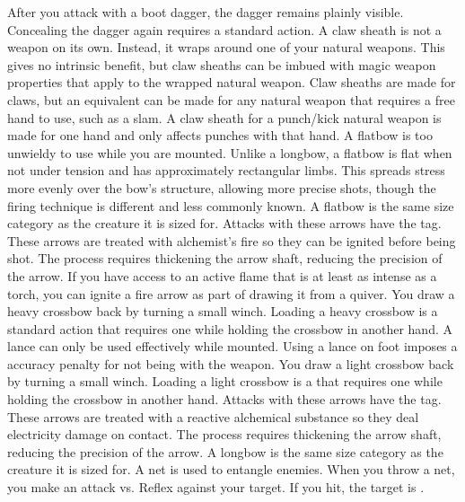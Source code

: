     After you attack with a boot dagger, the dagger remains plainly visible.
    Concealing the dagger again requires a standard action.
     A claw sheath is not a weapon on its own.
    Instead, it wraps around one of your natural weapons.
    This gives no intrinsic benefit, but claw sheaths can be imbued with magic weapon properties that apply to the wrapped natural weapon.
    Claw sheaths are made for claws, but an equivalent can be made for any natural weapon that requires a free hand to use, such as a slam.
    A claw sheath for a punch/kick natural weapon is made for one hand and only affects punches with that hand.
     A flatbow is too unwieldy to use while you are mounted.
    Unlike a longbow, a flatbow is flat when not under tension and has approximately rectangular limbs.
    This spreads stress more evenly over the bow's structure, allowing more precise shots, though the firing technique is different and less commonly known.
    A flatbow is the same size category as the creature it is sized for.
     Attacks with these arrows have the \atFire tag.
    These arrows are treated with alchemist's fire so they can be ignited before being shot.
    The process requires thickening the arrow shaft, reducing the precision of the arrow.
    If you have access to an active flame that is at least as intense as a torch, you can ignite a fire arrow as part of drawing it from a quiver.
     You draw a heavy crossbow back by turning a small winch.
    Loading a heavy crossbow is a standard action that requires one  while holding the crossbow in another hand.
     A lance can only be used effectively while mounted.
    Using a lance on foot imposes a  accuracy penalty for not being  with the weapon.
     You draw a light crossbow back by turning a small winch.
    Loading a light crossbow is a  that requires one  while holding the crossbow in another hand.
     Attacks with these arrows have the \atElectricity tag.
    These arrows are treated with a reactive alchemical substance so they deal electricity damage on contact.
    The process requires thickening the arrow shaft, reducing the precision of the arrow.
     A longbow is the same size category as the creature it is sized for.
     A net is used to entangle enemies. When you throw a net, you make an attack vs. Reflex against your target. If you hit, the target is \slowed.
